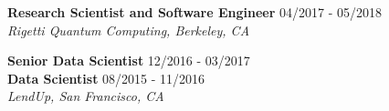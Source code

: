\documentclass[10pt,centered]{./res} %
\begin{document}
\begin{resume}
{\bf Research Scientist and Software Engineer} \hfill04/2017 - 05/2018 \\
{\it Rigetti Quantum Computing, Berkeley, CA}

{\bf Senior Data Scientist} \hfill12/2016 - 03/2017 \\
{\bf Data Scientist} \hfill08/2015 - 11/2016 \\
{\it LendUp, San Francisco, CA}


\end{resume}
\end{document}
